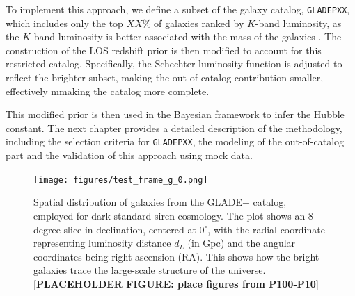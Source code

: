 To implement this approach, we define a subset of the galaxy catalog, \texttt{GLADEPXX}, which includes only the top $XX\%$ of galaxies ranked by $K$-band luminosity, as the $K$-band luminosity is better associated with the mass of the galaxies \citep{strazzullo2006near,sureshkumar2021galaxy}. The construction of the LOS redshift prior is then modified to account for this restricted catalog. Specifically, the Schechter luminosity function is adjusted to reflect the brighter subset, making the out-of-catalog contribution smaller, effectively mmaking the catalog more complete.

This modified prior is then used in the Bayesian framework to infer the Hubble constant. The next chapter provides a detailed description of the methodology, including the selection criteria for \texttt{GLADEPXX}, the modeling of the out-of-catalog part and the validation of this approach using mock data.

\begin{figure}[h!]
    \centering
    \texttt{[image: figures/test\_frame\_g\_0.png]}
    \caption[Spatial distribution of galaxies from the GLADE+ galaxy catalog and its subsets.]{Spatial distribution of galaxies from the GLADE+ catalog, employed for dark standard siren cosmology. The plot shows an 8-degree slice in declination, centered at $0^\circ$, with the radial coordinate representing luminosity distance $d_L$ (in Gpc) and the angular coordinates being right ascension (RA). This shows how the bright galaxies trace the large-scale structure of the universe.[\textbf{PLACEHOLDER FIGURE: place figures from P100-P10}]}
    \label{fig:dist_gladep}
\end{figure}